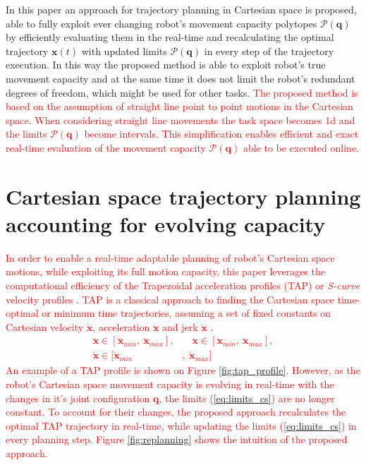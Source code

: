 In this paper an approach for trajectory planning in Cartesian space is proposed, able to fully exploit ever changing robot's movement capacity polytopes $\mathcal{P}(\bm{q})$ by efficiently evaluating them in the real-time and recalculating the optimal trajectory $\bm{x}(t)$ with updated limits $\mathcal{P}(\bm{q})$ in every step of the trajectory execution. In this way the proposed method is able to exploit robot's true movement capacity and at the same time it does not limit the robot's redundant degrees of freedom, which might be used for other tasks. 
\textcolor{red}{The proposed method is based on the assumption of straight line point to point motions in the Cartesian space. When considering straight line movements the task space becomes 1d and the limits $\mathcal{P}(\bm{q})$ become intervals. This simplification enables efficient and exact real-time evaluation of the movement capacity $\mathcal{P}(\bm{q})$ able to be executed online. }





\section{Cartesian space trajectory planning accounting for evolving capacity}


\textcolor{red}{In order to enable a real-time adaptable planning of robot's Cartesian space motions, while exploiting its full motion capacity, this paper leverages the computational efficiency of the Trapezoidal acceleration profiles (TAP) or \textit{S-curve} velocity profiles \cite{ruckig}\cite{modernrobotics}\cite{scurve}. 
TAP is a classical approach to finding the Cartesian space time-optimal or minimum time\cite{Gasparetto2012} trajectories, assuming a set of fixed constants on Cartesian velocity $\dot{\bm{x}}$, acceleration $\ddot{\bm{x}}$ and jerk $\dddot{\bm{x}}$ \cite{Meckl1998,Garcia2017}. 
\begin{equation}
\begin{split}
 \dddot{\bm{x\!}}\! \in\![ \dddot{\bm{x}\!}_{min},  ~\dddot{\bm{x}\!}_{max}],&\quad
\ddot{\bm{x}} \! \in\! [\ddot{\bm{x}}_{min}, ~\ddot{\bm{x}}_{max}], \\ \dot{\bm{x}} \! \in\! [\dot{\bm{x}}_{min}&, ~\dot{\bm{x}}_{max}]
\end{split}
\label{eq:limits_cs}
\end{equation}
An example of a TAP profile is shown on Figure \ref{fig:tap_profile}.
}
\textcolor{red}{
However, as the robot's Cartesian space movement capacity is evolving in real-time with the changes in it's joint configuration $\bm{q}$, the limits (\ref{eq:limits_cs}) are no longer constant. To account for their changes, the proposed approach recalculates the optimal TAP trajectory in real-time, while updating the limits (\ref{eq:limits_cs}) in every planning step. Figure \ref{fig:replanning} shows the intuition of the proposed approach.
}

